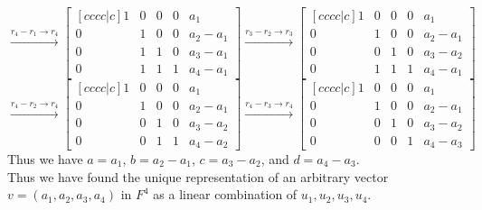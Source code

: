 \documentclass{article}
\begin{document}
$$ \xrightarrow{r_4 - r_1 \rightarrow r_4} \begin{bmatrix}[cccc|c]
    1 & 0 & 0 & 0 & a_1\\
    0 & 1 & 0 & 0 & a_2 - a_1\\
    0 & 1 & 1 & 0 & a_3 - a_1\\
    0 & 1 & 1 & 1 & a_4 - a_1
\end{bmatrix} \xrightarrow{r_3 - r_2 \rightarrow r_3} \begin{bmatrix}[cccc|c]
    1 & 0 & 0 & 0 & a_1\\
    0 & 1 & 0 & 0 & a_2 - a_1\\
    0 & 0 & 1 & 0 & a_3 - a_2\\
    0 & 1 & 1 & 1 & a_4 - a_1
\end{bmatrix}$$
$$ \xrightarrow{r_4 - r_2 \rightarrow r_4} \begin{bmatrix}[cccc|c]
    1 & 0 & 0 & 0 & a_1\\
    0 & 1 & 0 & 0 & a_2 - a_1\\
    0 & 0 & 1 & 0 & a_3 - a_2\\
    0 & 0 & 1 & 1 & a_4 - a_2
\end{bmatrix} \xrightarrow{r_4 - r_3 \rightarrow r_4} \begin{bmatrix}[cccc|c]
    1 & 0 & 0 & 0 & a_1\\
    0 & 1 & 0 & 0 & a_2 - a_1\\
    0 & 0 & 1 & 0 & a_3 - a_2\\
    0 & 0 & 0 & 1 & a_4 - a_3
\end{bmatrix}$$
Thus we have $a = a_1$, $b = a_2 - a_1$, $c = a_3 - a_2$, and $d = a_4 - a_3$.\\
Thus we have found the unique representation of an arbitrary vector $v = (a_1,a_2,a_3,a_4)$ in $F^4$ as a linear combination of $u_1 , u_2 , u_3 , u_4$.



    
\end{document}
